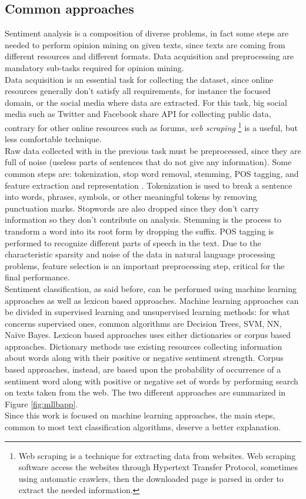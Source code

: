 \subsection{Common approaches}

Sentiment analysis is a composition of diverse problems, in fact some steps are needed to perform opinion mining on given texts, since texts are coming from different resources and different formats. Data acquisition and preprocessing are mandatory sub-tasks required for opinion mining.\\
Data acquisition is an essential task for collecting the dataset, since online resources generally don't satisfy all requirements, for instance the focused domain, or the social media where data are extracted. For this task, big social media such as Twitter and Facebook share \ac{API} for collecting public data, contrary for other online resources such as forums, \textit{web scraping} \footnote{Web scraping is a technique for extracting data from websites. Web scraping software access the websites through Hypertext Transfer Protocol, sometimes using automatic crawlers, then the downloaded page is parsed in order to extract the needed information.} is a useful, but less comfortable technique.\\
Raw data collected with in the previous task must be preprocessed, since they are full of noise (useless parts of sentences that do not give any information). Some common steps are: tokenization, stop word removal, stemming, \ac{POS} tagging, and feature extraction and
representation \cite{RAVI201514}. Tokenization is used to break a sentence into words, phrases, symbols, or other meaningful tokens by removing punctuation marks. Stopwords are also dropped since they don't carry information so they don't contribute on analysis. Stemming is the process to transform a word into its root form by dropping the suffix. \ac{POS} tagging is performed to recognize different parts of speech in the text. Due to the characteristic sparsity and noise of the data in natural language processing problems, feature selection is an important preprocessing step, critical for the final performance.\\
Sentiment classification, as said before, can be performed using machine learning approaches as well as lexicon based approaches. Machine learning approaches can be divided in supervised learning and unsupervised learning methods: for what concerns supervised ones, common algorithms are Decision Trees, \ac{SVM}, \ac{NN}, Na{\"i}ve Bayes. Lexicon based approaches uses either dictionaries or corpus based approaches. Dictionary methods use existing resources collecting information about words along with their positive or negative sentiment strength. Corpus based approaches, instead, are based upon the probability of occurrence of a sentiment word along with positive or negative set of words by performing search on texts taken from the web. The two different approaches are summarized in Figure \ref{fig:mllbapp}.\\
Since this work is focused on machine learning approaches, the main steps, common to most text classification algorithms, deserve a better explanation.

